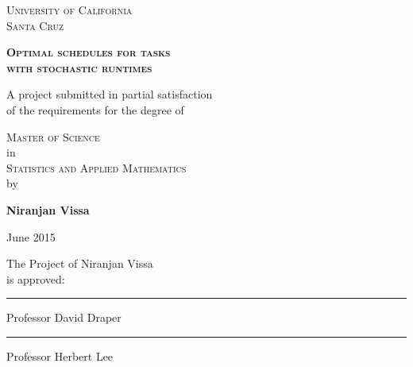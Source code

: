 \documentclass[12pt]{report}
\begin{document}
\begin{titlepage}
\begin{center}

\textsc{\Large University of California \\
Santa Cruz } \\
\vspace*{0.15in}

\textsc{\Large \textbf{Optimal schedules for tasks \\
with stochastic runtimes}}
\vspace*{0.15in}

\large
A project submitted in partial satisfaction \vspace*{-0.1in} \\
of the requirements for the degree of \\
\vspace*{0.15in}

\textsc{\Large Master of Science} \\
\large in \\

\textsc{\Large Statistics and Applied Mathematics} \\
\large by \\
\vspace*{0.15in}

\textbf{Niranjan Vissa} \\
\vspace*{0.15in}

June 2015
\large
\vspace*{0.15in}

\begin{flushright}

The Project of Niranjan Vissa \\
is approved:
\vspace*{-0.1in}
\vspace*{0.2in}

\rule{2.5in}{.01cm}

Professor David Draper

\vspace*{0.2in}

\rule{2.5in}{.01cm}

Professor Herbert Lee

\end{flushright}

\end{center}
\end{titlepage}


\end{document}
